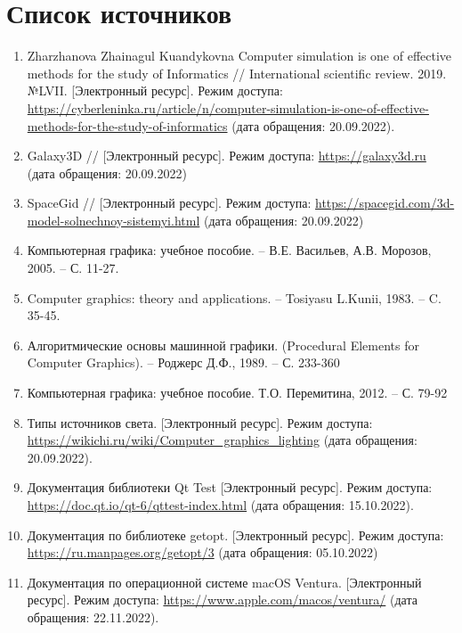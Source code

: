 %



\section*{\large Список источников}
\begin{enumerate}
	\item Zharzhanova Zhainagul Kuandykovna Computer simulation is one of effective methods for the study of Informatics // International scientific review. 2019. №LVII. [Электронный ресурс]. Режим доступа: \url{https://cyberleninka.ru/article/n/computer-simulation-is-one-of-effective-methods-for-the-study-of-informatics}  (дата обращения: 20.09.2022). \label{bib:1}
	\item Galaxy3D // [Электронный ресурс]. Режим доступа: \url{https://galaxy3d.ru} (дата обращения: 20.09.2022) \label{bib:2}
	\item SpaceGid // [Электронный ресурс]. Режим доступа: \url{https://spacegid.com/3d-model-solnechnoy-sistemyi.html} (дата обращения: 20.09.2022) \label{bib:3}
	\item Компьютерная графика: учебное пособие. -- В.Е. Васильев, А.В. Морозов, 2005. -- С. 11-27. \label{bib:4}
	\item Computer graphics: theory and applications. -- Tosiyasu L.Kunii, 1983. -- C. 35-45. \label{bib:5}
	\item Алгоритмические основы машинной графики. (Procedural Elements for Computer Graphics). -- Роджерс Д.Ф., 1989. -- С. 233-360 \label{bib:6}
	\item Компьютерная графика: учебное пособие. Т.О. Перемитина, 2012. -- С. 79-92 \label{bib:7} 
	\item Типы источников света. [Электронный ресурс]. Режим доступа: \url{https://wikichi.ru/wiki/Computer_graphics_lighting} (дата обращения: 20.09.2022). \label{bib:8}
	\item Документация библиотеки Qt Test [Электронный ресурс]. Режим доступа: \url{https://doc.qt.io/qt-6/qttest-index.html} (дата обращения: 15.10.2022). \label{bib:9}
	\item Документация по библиотеке getopt. [Электронный ресурс]. Режим доступа: \url{https://ru.manpages.org/getopt/3} (дата обращения: 05.10.2022) \label{bib:10}
	\item Документация по операционной системе macOS Ventura. [Электронный ресурс]. Режим доступа: \url{https://www.apple.com/macos/ventura/} (дата обращения: 22.11.2022). \label{bib:11}

\end{enumerate}
